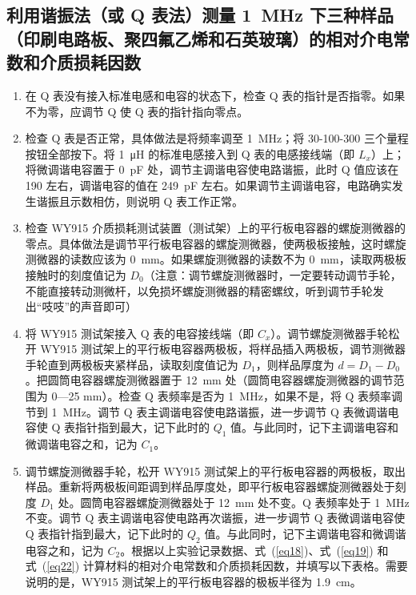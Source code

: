 \documentclass[a4paper,utf8]{article}
\newcommand{\seqref}[1]{式~(\ref{#1})}
\begin{document}
    \subsection{利用谐振法（或 Q 表法）测量 \SI{1}{\mega\hertz} 下三种样品（印刷电路板、聚四氟乙烯和石英玻璃）的相对介电常数和介质损耗因数}
    \begin{enumerate}
        \item 在 Q 表没有接入标准电感和电容的状态下，检查 Q 表的指针是否指零。如果不为零，应调节 Q 使 Q 表的指针指向零点。
        \item 检查 Q 表是否正常，具体做法是将频率调至 \SI{1}{\mega\hertz}；将 30-100-300 三个量程按钮全部按下。将 \SI{1}{\micro\henry} 的标准电感接入到 Q 表的电感接线端（即 $L_x$）上；将微调谐电容置于 \SI{0}{\pico\farad} 处，调节主调谐电容使电路谐振，此时 Q 值应该在 190 左右，调谐电容的值在 \SI{249}{\pico\farad} 左右。如果调节主调谐电容，电路确实发生谐振且示数相仿，则说明 Q 表工作正常。
        \item 检查 WY915 介质损耗测试装置（测试架）上的平行板电容器的螺旋测微器的零点。具体做法是调节平行板电容器的螺旋测微器，使两极板接触，这时螺旋测微器的读数应该为 \SI{0}{\milli\metre}。如果螺旋测微器的读数不为 \SI{0}{\milli\metre}，读取两极板接触时的刻度值记为 $D_0$（注意：调节螺旋测微器时，一定要转动调节手轮，不能直接转动测微杆，以免损坏螺旋测微器的精密螺纹，听到调节手轮发出“吱吱”的声音即可）
        \item 将 WY915 测试架接入 Q 表的电容接线端（即 $C_x$）。调节螺旋测微器手轮松开 WY915 测试架上的平行板电容器两极板，将样品插入两极板，调节测微器手轮直到两极板夹紧样品，读取刻度值记为 $D_1$，则样品厚度为 $d = D_1 - D_0$。把圆筒电容器螺旋测微器置于 \SI{12}{\milli\metre} 处（圆筒电容器螺旋测微器的调节范围为 0—25 \unit{\milli\metre}）。检查 Q 表频率是否为 \SI{1}{\mega\hertz}，如果不是，将 Q 表频率调节到 \SI{1}{\mega\hertz}。调节 Q 表主调谐电容使电路谐振，进一步调节 Q 表微调谐电容使 Q 表指针指到最大，记下此时的 $Q_1$ 值。与此同时，记下主调谐电容和微调谐电容之和，记为 $C_1$。
        \item 调节螺旋测微器手轮，松开 WY915 测试架上的平行板电容器的两极板，取出样品。重新将两极板间距调到样品厚度处，即平行板电容器螺旋测微器处于刻度 $D_1$ 处。圆筒电容器螺旋测微器处于 \SI{12}{\milli\metre} 处不变。Q 表频率处于 \SI{1}{\mega\hertz} 不变。调节 Q 表主调谐电容使电路再次谐振，进一步调节 Q 表微调谐电容使 Q 表指针指到最大，记下此时的 $Q_2$ 值。与此同时，记下主调谐电容和微调谐电容之和，记为 $C_2$。根据以上实验记录数据、\seqref{eq18}、\seqref{eq19} 和 \seqref{eq22} 计算材料的相对介电常数和介质损耗因数，并填写以下表格。需要说明的是，WY915 测试架上的平行板电容器的极板半径为 \SI{1.9}{\centi\metre}。
    \end{enumerate}
\end{document}
